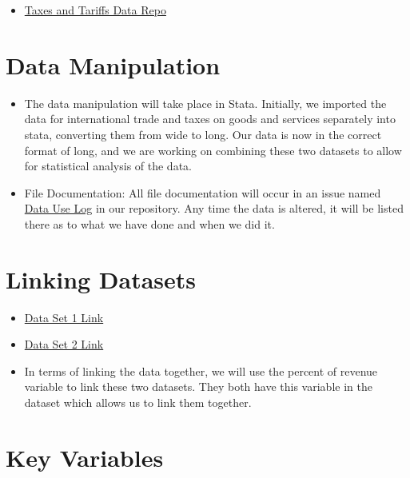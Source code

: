 \documentclass[12pt]{article}
\begin{document}
\noindent
\begin{itemize}

    \item \href{https://github.com/ecn310/course-project-taxes-tariffs/issues/6}{Taxes and Tariffs Data Repo}
\end{itemize}


\section{Data Manipulation}
\label{sec:data}

\begin{itemize}
    \item The data manipulation will take place in Stata. Initially, we imported the data for international trade and taxes on goods and services separately into stata, converting them from wide to long. Our data is now in the correct format of long, and we are working on combining these two datasets to allow for statistical analysis of the data.
    \item File Documentation: All file documentation will occur in an issue named \href{https://github.com/ecn310/course-project-taxes-tariffs/issues/6}{Data Use Log} in our repository. Any time the data is altered, it will be listed there as to what we have done and when we did it.
\end{itemize}

\section{Linking Datasets}
\label{sec:discussion}

\begin{itemize}
    \item \href{https://wits.worldbank.org/CountryProfile/en/Country/BY-COUNTRY/StartYear/1988/EndYear/2022/Indicator/GC-TAX-INTT-RV-ZS}{Data Set 1 Link}

 \item \href{https://wits.worldbank.org/CountryProfile/en/country/by-country/startyear/LTST/endyear/LTST/indicator/GC-TAX-GSRV-RV-ZS}{Data Set 2 Link}
 \item In terms of linking the data together, we will use the percent of revenue variable to link these two datasets. They both have this variable in the dataset which allows us to link them together. 
\end{itemize}

\section{Key Variables}
\label{sec:result}
\end{document}

